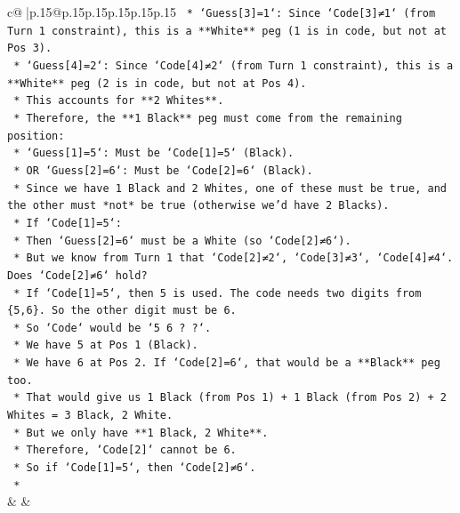 \documentclass{article}
\begin{document}
{\begin{supertabular}{c@{$\;$}|p{.15\linewidth}@{}p{.15\linewidth}p{.15\linewidth}p{.15\linewidth}p{.15\linewidth}p{.15\linewidth}}
{{{\texttt{        *   `Guess{[}3{]}=1`: Since `Code{[}3{]}≠1` (from Turn 1 constraint), this is a **White** peg (1 is in code, but not at Pos 3).} \\
\texttt{        *   `Guess{[}4{]}=2`: Since `Code{[}4{]}≠2` (from Turn 1 constraint), this is a **White** peg (2 is in code, but not at Pos 4).} \\
\texttt{    *   This accounts for **2 Whites**.} \\
\texttt{    *   Therefore, the **1 Black** peg must come from the remaining position:} \\
\texttt{        *   `Guess{[}1{]}=5`: Must be `Code{[}1{]}=5` (Black).} \\
\texttt{        *   OR `Guess{[}2{]}=6`: Must be `Code{[}2{]}=6` (Black).} \\
\texttt{    *   Since we have 1 Black and 2 Whites, one of these must be true, and the other must *not* be true (otherwise we'd have 2 Blacks).} \\
\texttt{    *   If `Code{[}1{]}=5`:} \\
\texttt{        *   Then `Guess{[}2{]}=6` must be a White (so `Code{[}2{]}≠6`).} \\
\texttt{        *   But we know from Turn 1 that `Code{[}2{]}≠2`, `Code{[}3{]}≠3`, `Code{[}4{]}≠4`. Does `Code{[}2{]}≠6` hold?} \\
\texttt{        *   If `Code{[}1{]}=5`, then 5 is used. The code needs two digits from \{5,6\}. So the other digit must be 6.} \\
\texttt{        *   So `Code` would be `5 6 ? ?`.} \\
\texttt{        *   We have 5 at Pos 1 (Black).} \\
\texttt{        *   We have 6 at Pos 2. If `Code{[}2{]}=6`, that would be a **Black** peg too.} \\
\texttt{        *   That would give us 1 Black (from Pos 1) + 1 Black (from Pos 2) + 2 Whites = 3 Black, 2 White.} \\
\texttt{        *   But we only have **1 Black, 2 White**.} \\
\texttt{        *   Therefore, `Code{[}2{]}` cannot be 6.} \\
\texttt{        *   So if `Code{[}1{]}=5`, then `Code{[}2{]}≠6`.} \\
\texttt{    *} \\
            }
        }
    }
    & & \\ \\


\end{supertabular}}
\end{document}
